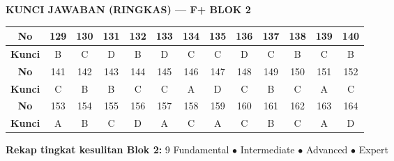 \documentclass[11pt,a4paper]{exam}
\begin{document}
\clearpage
{\large\bfseries\color{biru} KUNCI JAWABAN (RINGKAS) — F+ BLOK 2}\par
\vspace{8pt}
\renewcommand{\arraystretch}{1.3}
\begin{center}
\begin{tabular}{|c|*{12}{c|}}
\hline
\cellcolor{biru!15}\textbf{No} & 129 & 130 & 131 & 132 & 133 & 134 & 135 & 136 & 137 & 138 & 139 & 140\\\hline
\cellcolor{biru!15}\textbf{Kunci} & B & C & D & B & D & C & C & D & C & B & C & B\\\hline\hline
\cellcolor{biru!15}\textbf{No} & 141 & 142 & 143 & 144 & 145 & 146 & 147 & 148 & 149 & 150 & 151 & 152\\\hline
\cellcolor{biru!15}\textbf{Kunci} & C & B & B & C & C & A & D & C & B & C & A & C\\\hline\hline
\cellcolor{biru!15}\textbf{No} & 153 & 154 & 155 & 156 & 157 & 158 & 159 & 160 & 161 & 162 & 163 & 164\\\hline
\cellcolor{biru!15}\textbf{Kunci} & A & B & C & D & A & C & A & C & B & C & A & D\\\hline
\end{tabular}
\end{center}

\vspace{8pt}
\begin{center}\small
\textbf{Rekap tingkat kesulitan Blok 2:}
9 Fundamental \;$\bullet$ Intermediate \;$\bullet$ Advanced \;$\bullet$ Expert
\end{center}
\end{document}
